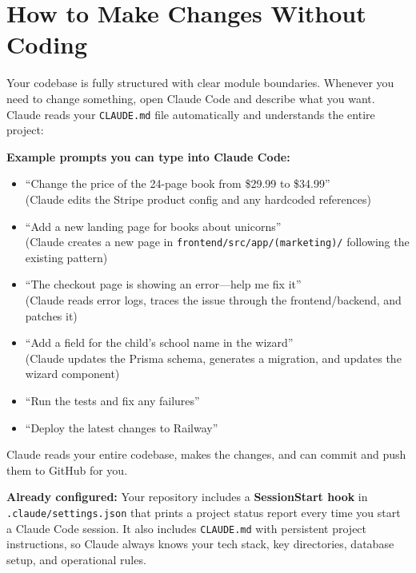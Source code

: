 \documentclass[12pt, letterpaper, oneside]{book}
\begin{document}
\section{How to Make Changes Without Coding}

Your codebase is fully structured with clear module boundaries. Whenever you need to change something, open Claude Code and describe what you want. Claude reads your \texttt{CLAUDE.md} file automatically and understands the entire project:

\begin{infobox}
\textbf{Example prompts you can type into Claude Code:}
\begin{itemize}[leftmargin=1.5em, itemsep=4pt]
  \item ``Change the price of the 24-page book from \$29.99 to \$34.99'' \\ {\small(Claude edits the Stripe product config and any hardcoded references)}
  \item ``Add a new landing page for books about unicorns'' \\ {\small(Claude creates a new page in \texttt{frontend/src/app/(marketing)/} following the existing pattern)}
  \item ``The checkout page is showing an error---help me fix it'' \\ {\small(Claude reads error logs, traces the issue through the frontend/backend, and patches it)}
  \item ``Add a field for the child's school name in the wizard'' \\ {\small(Claude updates the Prisma schema, generates a migration, and updates the wizard component)}
  \item ``Run the tests and fix any failures''
  \item ``Deploy the latest changes to Railway''
\end{itemize}
Claude reads your entire codebase, makes the changes, and can commit and push them to GitHub for you.
\end{infobox}

\begin{successbox}
\textbf{Already configured:} Your repository includes a \textbf{SessionStart hook} in \texttt{.claude/settings.json} that prints a project status report every time you start a Claude Code session. It also includes \texttt{CLAUDE.md} with persistent project instructions, so Claude always knows your tech stack, key directories, database setup, and operational rules.
\end{successbox}
\end{document}
